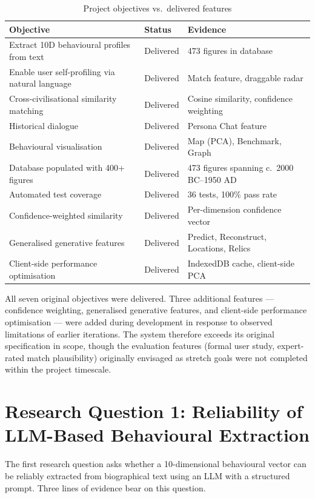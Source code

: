 \documentclass[11pt, a4paper]{report}
\begin{document}
\begin{table}[H]
  \centering
  \caption{Project objectives vs.\ delivered features}
  \label{tab:objectives}
  \begin{tabular}{p{5.5cm}lp{4.5cm}}
    \toprule
    Objective & Status & Evidence \\
    \midrule
    Extract 10D behavioural profiles from text & Delivered & 473 figures in database \\
    Enable user self-profiling via natural language & Delivered & Match feature, draggable radar \\
    Cross-civilisational similarity matching & Delivered & Cosine similarity, confidence weighting \\
    Historical dialogue & Delivered & Persona Chat feature \\
    Behavioural visualisation & Delivered & Map (PCA), Benchmark, Graph \\
    Database populated with 400+ figures & Delivered & 473 figures spanning c.\ 2000 BC–1950 AD \\
    Automated test coverage & Delivered & 36 tests, 100\% pass rate \\
    Confidence-weighted similarity & Delivered & Per-dimension confidence vector \\
    Generalised generative features & Delivered & Predict, Reconstruct, Locations, Relics \\
    Client-side performance optimisation & Delivered & IndexedDB cache, client-side PCA \\
    \bottomrule
  \end{tabular}
\end{table}

All seven original objectives were delivered. Three additional features — confidence weighting, generalised generative features, and client-side performance optimisation — were added during development in response to observed limitations of earlier iterations. The system therefore exceeds its original specification in scope, though the evaluation features (formal user study, expert-rated match plausibility) originally envisaged as stretch goals were not completed within the project timescale.

\section{Research Question 1: Reliability of LLM-Based Behavioural Extraction}

The first research question asks whether a 10-dimensional behavioural vector can be reliably extracted from biographical text using an LLM with a structured prompt. Three lines of evidence bear on this question.
\end{document}
